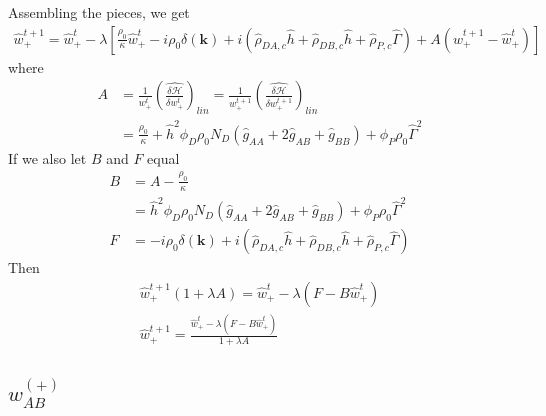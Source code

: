 \documentclass{article}
\begin{document}
  Assembling the pieces, we get
  \begin{align*}
    \hat{w}_+^{t+1} =
      \hat{w}_+^t - \lambda \left[
        \frac{\rho_0}{\kappa} \hat{w}_+^t
        - i \rho_0 \delta(\mathbf{k})
        + i ( \hat{\rho}_{DA,c} \hat{h}
              + \hat{\rho}_{DB,c} \hat{h}
              + \hat{\rho}_{P,c}  \hat{\Gamma} )
        + A (\hat{w}_+^{t+1} - \hat{w}_+^t)
      \right]
  \end{align*}
  where
  \begin{align*}
    A &=
    \frac{1}{w_+^t}
    \left( \hat{\frac{\delta \mathcal{H}}{\delta w_+^t}} \right) _{lin}
    =
    \frac{1}{w_+^{t+1}}
    \left( \hat{\frac{\delta \mathcal{H}}{\delta w_+^{t+1}}} \right) _{lin} \\
    &=
    \frac{\rho_0}{\kappa}
        + \hat{h}^2 \phi_D \rho_0 N_D
          (\hat{g}_{AA} + 2 \hat{g}_{AB} + \hat{g}_{BB})
        + \phi_P \rho_0 \hat{\Gamma}^2
  \end{align*}
  If we also let $B$ and $F$ equal
  \begin{align*}
    B &= A - \frac{\rho_0}{\kappa} \\
      &= \hat{h}^2 \phi_D \rho_0 N_D
          (\hat{g}_{AA} + 2 \hat{g}_{AB} + \hat{g}_{BB})
        + \phi_P \rho_0 \hat{\Gamma}^2 \\
    F &= - i \rho_0 \delta (\mathbf{k})
         + i ( \hat{\rho}_{DA,c} \hat{h}
              + \hat{\rho}_{DB,c} \hat{h}
              + \hat{\rho}_{P,c}  \hat{\Gamma} )
  \end{align*}
  Then
  \begin{align*}
    \hat{w}_+^{t+1} ( 1 + \lambda A ) =
    \hat{w}_+^t - \lambda \left( F - B \hat{w}_+^t \right) \\
    \hat{w}_+^{t+1} =
    \frac{\hat{w}_+^t - \lambda \left( F - B \hat{w}_+^t \right)}
         {1 + \lambda A}
  \end{align*}
  
  \subsection{$w_{AB}^{(+)}$}
  
\end{document}
